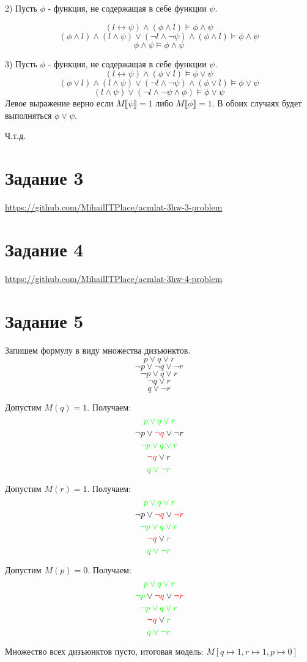 \documentclass{article}
\begin{document}
2) Пусть \(\phi\) - функция, не содержащая в себе функции \(\psi\).

\[(l \leftrightarrow \psi) \land (\phi \land l) \models \phi \land \psi\]
\[(\phi \land l) \land (l \land \psi) \lor (\neg l \land \neg \psi) \land (\phi \land l) \models \phi \land \psi\]
\[\phi \land \psi \models \phi \land \psi\]

3) Пусть \(\phi\) - функция, не содержащая в себе функции \(\psi\).
\[(l \leftrightarrow \psi) \land (\phi \lor l) \models \phi \lor \psi\]
\[(\phi \lor l) \land (l \land \psi) \lor (\neg l \land \neg \psi) \land (\phi \lor l) \models \phi \lor \psi\]
\[(l \land \psi) \lor (\neg l \land \neg \psi \land \phi) \models \phi \lor \psi\]
Левое выражение верно если \(M\llbracket \psi \rrbracket = 1\) либо \(M\llbracket \phi \rrbracket = 1\). 
В обоих случаях будет выполняться \(\phi \lor \psi\). 

Ч.т.д.

\section*{Задание 3}
\url{https://github.com/MihailITPlace/acmlat-3hw-3-problem}

\section*{Задание 4}
\url{https://github.com/MihailITPlace/acmlat-3hw-4-problem}

\section*{Задание 5}
Запишем формулу в виду множества дизъюнктов.
\[p \lor q \lor r\]
\[\neg p \lor \neg q \lor \neg r\]
\[\neg p \lor q \lor r\]
\[\neg q \lor r\]
\[q \lor \neg r\]

Допустим \(M(q) = 1\). Получаем:
\[\textcolor{green}{p \lor q \lor r}\]
\[\neg p \lor \textcolor{red}{\neg q} \lor \neg r\]
\[\textcolor{green}{\neg p \lor q \lor r}\]
\[\textcolor{red}{\neg q} \lor r\]
\[\textcolor{green}{q \lor \neg r}\]

Допустим \(M(r) = 1\). Получаем:
\[\textcolor{green}{p \lor q \lor r}\]
\[\neg p \lor \textcolor{red}{\neg q} \lor \textcolor{red}{\neg r}\]
\[\textcolor{green}{\neg p \lor q \lor r}\]
\[\textcolor{red}{\neg q} \lor \textcolor{green}{r}\]
\[\textcolor{green}{q \lor \neg r}\]

Допустим \(M(p) = 0\). Получаем:
\[\textcolor{green}{p \lor q \lor r}\]
\[\textcolor{green}{\neg p} \lor \textcolor{red}{\neg q} \lor \textcolor{red}{\neg r}\]
\[\textcolor{green}{\neg p \lor q \lor r}\]
\[\textcolor{red}{\neg q} \lor \textcolor{green}{r}\]
\[\textcolor{green}{q \lor \neg r}\]

Множество всех дизъюнктов пусто, итоговая модель: 
\(M[q \mapsto 1, r \mapsto 1, p \mapsto 0]\)
\end{document}
